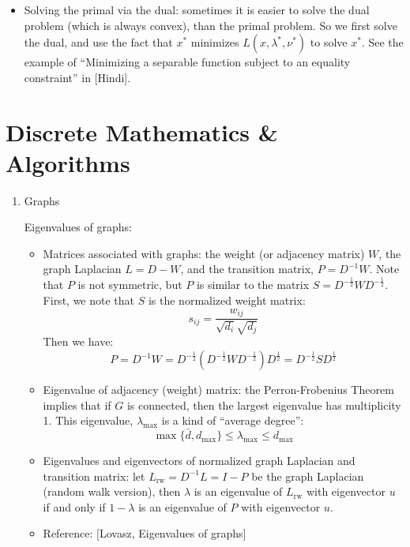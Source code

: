 \documentclass{report}
\begin{document}
\begin{itemize}
\item Solving the primal via the dual: sometimes it is easier to solve the dual problem (which is always convex), than the primal problem. So we first solve the dual, and use the fact that $x^*$ minimizes $L(x,\lambda^*, \nu^*)$ to solve $x^*$. See the example of ``Minimizing a separable function subject to an equality constraint'' in [Hindi]. 
\end{itemize}
\chapter{Discrete Mathematics \& Algorithms}
\begin{enumerate}

\item{Graphs}

Eigenvalues of graphs: 
\begin{itemize}
\item Matrices associated with graphs: the weight (or adjacency matrix) $W$, the graph Laplacian $L = D - W$, and the transition matrix, $P = D^{-1} W$. Note that $P$ is not symmetric, but $P$ is similar to the matrix $S = D^{-\frac{1}{2}} W D^{-\frac{1}{2}}$. First, we note that $S$ is the normalized weight matrix: 
\begin{equation}
s_{ij} = \frac{w_{ij}}{\sqrt{d_i} \sqrt{d_j}}
\end{equation}
Then we have: 
\begin{equation}
P = D^{-1} W = 	D^{-\frac{1}{2}} (D^{-\frac{1}{2}} W D^{-\frac{1}{2}}) D^{\frac{1}{2}} = D^{-\frac{1}{2}} S D^{\frac{1}{2}}
\end{equation}

\item Eigenvalue of adjacency (weight) matrix: the Perron-Frobenius Theorem implies that if $G$ is connected, then the largest eigenvalue has multiplicity 1. This eigenvalue, $\lambda_{\max}$ is a kind of ``average degree'': 
\begin{equation}
\max\{\bar{d}, d_{\max}\}	\leq \lambda_{\max} \leq d_{\max}
\end{equation}

\item Eigenvalues and eigenvectors of normalized graph Laplacian and transition matrix: let $L_{\text{rw}} = D^{-1} L = I - P$ be the graph Laplacian (random walk version), then $\lambda$ is an eigenvalue of $L_{\text{rw}}$ with eigenvector $u$ if and only if $1 - \lambda$ is an eigenvalue of $P$ with eigenvector $u$.

\item Reference: [Lovasz, Eigenvalues of graphs]
\end{itemize}

\end{enumerate}
\end{document}
